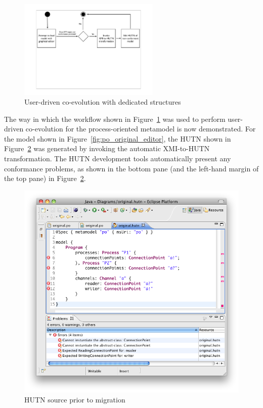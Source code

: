 \begin{figure}[htbp]
	\centering
	\includegraphics*[viewport=80 290 760 550,height=4.75cm]{6.Evaluation/images/user_driven/hutn_process.pdf}
	\caption{User-driven co-evolution with dedicated structures}
	\label{fig:hutn_process}
\end{figure}

The way in which the workflow shown in Figure~\ref{fig:hutn_process} was used to perform user-driven co-evolution for the process-oriented metamodel is now demonstrated. For the model shown in Figure~\ref{fig:po_original_editor}, the HUTN shown in Figure~\ref{fig:po_hutn} was generated by invoking the automatic XMI-to-HUTN transformation. The HUTN development tools automatically present any conformance problems, as shown in the bottom pane (and the left-hand margin of the top pane) in Figure~\ref{fig:po_hutn}.

\begin{figure}[htbp]
  \centering
  \includegraphics[width=12.75cm]{6.Evaluation/images/user_driven/po_hutn.png}
  \caption{HUTN source prior to migration}
  \label{fig:po_hutn}
\end{figure}

